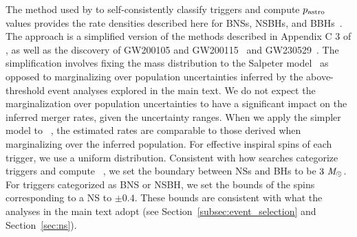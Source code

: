 The method used by \GSTLAL to self-consistently classify triggers and compute 
$p_{\rm astro}$~\citep{LIGOScientific:2018mvr, LIGOScientific:2021usb, KAGRA:2021vkt, Kapadia:2019uut, GWTC:Methods, GWTC:Results, Ray:2023nhx} 
values provides the rate densities described here for \acp{BNS}, \acp{NSBH}, 
and \acp{BBH}~\citep{GWTC:Methods, Kapadia:2019uut}.
The approach is a simplified version of the methods described in Appendix C 3 of 
\citet{KAGRA:2021duu}, as well as the discovery of GW200105 and 
GW200115~\citep{LIGOScientific:2021qlt} and GW230529~\citep{LIGOScientific:2024elc}. 
The simplification involves fixing the mass distribution to the Salpeter 
model~\citep{Salpeter:1955it} as opposed to marginalizing over population 
uncertainties inferred by the above-threshold event analyses explored in the main 
text.
We do not expect the marginalization over population uncertainties to have a 
significant impact on the inferred merger rates, given the uncertainty ranges.
When we apply the simpler model to \gwtcthree~\citep{KAGRA:2021duu}, the estimated
rates are comparable to those derived when marginalizing over the inferred population.
For effective inspiral spins of each trigger, we use a uniform distribution. 
Consistent with how searches categorize triggers and compute 
\VT~\citep{GWTC:Methods}, we set the boundary between \acp{NS} and 
\acp{BH} to be $3~\mathit{M_\odot}$. 
For triggers categorized as \ac{BNS} or \ac{NSBH}, we set the bounds of the 
spins corresponding to a \ac{NS} to $\pm 0.4$.
These bounds are consistent with what the analyses in the main text adopt 
(see Section~\ref{subsec:event_selection} and Section~\ref{sec:ns}).

